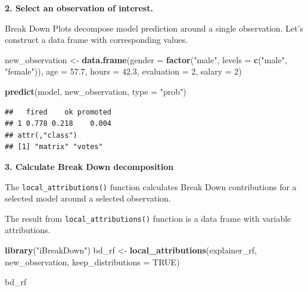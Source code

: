 \documentclass[]{krantz}
\newenvironment{Shaded}{\begin{snugshade}}{\end{snugshade}}
\newcommand{\DataTypeTok}[1]{\textcolor[rgb]{0.13,0.29,0.53}{#1}}
\newcommand{\DecValTok}[1]{\textcolor[rgb]{0.00,0.00,0.81}{#1}}
\newcommand{\FloatTok}[1]{\textcolor[rgb]{0.00,0.00,0.81}{#1}}
\newcommand{\KeywordTok}[1]{\textcolor[rgb]{0.13,0.29,0.53}{\textbf{#1}}}
\newcommand{\NormalTok}[1]{#1}
\newcommand{\OperatorTok}[1]{\textcolor[rgb]{0.81,0.36,0.00}{\textbf{#1}}}
\newcommand{\OtherTok}[1]{\textcolor[rgb]{0.56,0.35,0.01}{#1}}
\newcommand{\StringTok}[1]{\textcolor[rgb]{0.31,0.60,0.02}{#1}}
\theoremstyle{definition}
\theoremstyle{definition}
\theoremstyle{definition}
\theoremstyle{remark}
\begin{document}
\begin{Shaded}
\end{Shaded}

\textbf{2. Select an observation of interest.}

Break Down Plots decompose model prediction around a single observation.
Let's construct a data frame with corresponding values.

\begin{Shaded}
\begin{Highlighting}[]
\NormalTok{new_observation <-}\StringTok{ }\KeywordTok{data.frame}\NormalTok{(}\DataTypeTok{gender =} \KeywordTok{factor}\NormalTok{(}\StringTok{"male"}\NormalTok{, }\DataTypeTok{levels =} \KeywordTok{c}\NormalTok{(}\StringTok{"male"}\NormalTok{, }\StringTok{"female"}\NormalTok{)),}
                      \DataTypeTok{age =} \FloatTok{57.7}\NormalTok{,}
                      \DataTypeTok{hours =} \FloatTok{42.3}\NormalTok{,}
                      \DataTypeTok{evaluation =} \DecValTok{2}\NormalTok{,}
                      \DataTypeTok{salary =} \DecValTok{2}\NormalTok{)}

\KeywordTok{predict}\NormalTok{(model, new_observation, }\DataTypeTok{type =} \StringTok{"prob"}\NormalTok{)}
\end{Highlighting}
\end{Shaded}

\begin{verbatim}
##   fired    ok promoted
## 1 0.778 0.218    0.004
## attr(,"class")
## [1] "matrix" "votes"
\end{verbatim}

\textbf{3. Calculate Break Down decomposition}

The \texttt{local\_attributions()} function calculates Break Down
contributions for a selected model around a selected observation.

The result from \texttt{local\_attributions()} function is a data frame
with variable attributions.

\begin{Shaded}
\begin{Highlighting}[]
\KeywordTok{library}\NormalTok{(}\StringTok{"iBreakDown"}\NormalTok{)}
\NormalTok{bd_rf <-}\StringTok{ }\KeywordTok{local_attributions}\NormalTok{(explainer_rf,}
\NormalTok{                 new_observation,}
                 \DataTypeTok{keep_distributions =} \OtherTok{TRUE}\NormalTok{)}

\NormalTok{bd_rf}
\end{Highlighting}
\end{Shaded}
\end{document}
